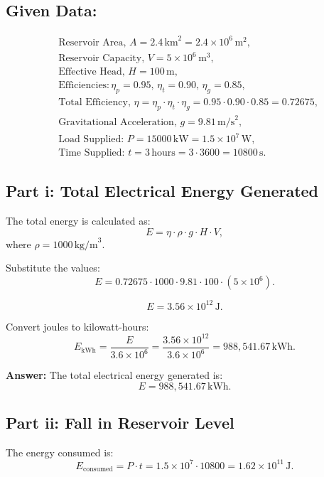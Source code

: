 \documentclass[12pt]{article}
\begin{document}
	
	
	
	
	
  
  \subsection*{Given Data:}
  \[
  \begin{aligned}
  	&\text{Reservoir Area, } A = 2.4 \, \text{km}^2 = 2.4 \times 10^6 \, \text{m}^2, \\
  	&\text{Reservoir Capacity, } V = 5 \times 10^6 \, \text{m}^3, \\
  	&\text{Effective Head, } H = 100 \, \text{m}, \\
  	&\text{Efficiencies:} \, \eta_p = 0.95, \, \eta_t = 0.90, \, \eta_g = 0.85, \\
  	&\text{Total Efficiency, } \eta = \eta_p \cdot \eta_t \cdot \eta_g = 0.95 \cdot 0.90 \cdot 0.85 = 0.72675, \\
  	&\text{Gravitational Acceleration, } g = 9.81 \, \text{m/s}^2, \\
  	&\text{Load Supplied: } P = 15000 \, \text{kW} = 1.5 \times 10^7 \, \text{W}, \\
  	&\text{Time Supplied: } t = 3 \, \text{hours} = 3 \cdot 3600 = 10800 \, \text{s}.
  \end{aligned}
  \]
  
  \subsection*{Part i: Total Electrical Energy Generated}
  The total energy is calculated as:  
  \[
  E = \eta \cdot \rho \cdot g \cdot H \cdot V,
  \]
  where \( \rho = 1000 \, \text{kg/m}^3 \).
  
  Substitute the values:  
  \[
  E = 0.72675 \cdot 1000 \cdot 9.81 \cdot 100 \cdot (5 \times 10^6).
  \]
  
  \[
  E = 3.56 \times 10^{12} \, \text{J}.
  \]
  
  Convert joules to kilowatt-hours:  
  \[
  E_{\text{kWh}} = \frac{E}{3.6 \times 10^6} = \frac{3.56 \times 10^{12}}{3.6 \times 10^6} = 988,541.67 \, \text{kWh}.
  \]
  
  \textbf{Answer:} The total electrical energy generated is:
  \[
  E = 988,541.67 \, \text{kWh}.
  \]
  
  \subsection*{Part ii: Fall in Reservoir Level}
  The energy consumed is:
  \[
  E_{\text{consumed}} = P \cdot t = 1.5 \times 10^7 \cdot 10800 = 1.62 \times 10^{11} \, \text{J}.
  \]
  
\end{document}
